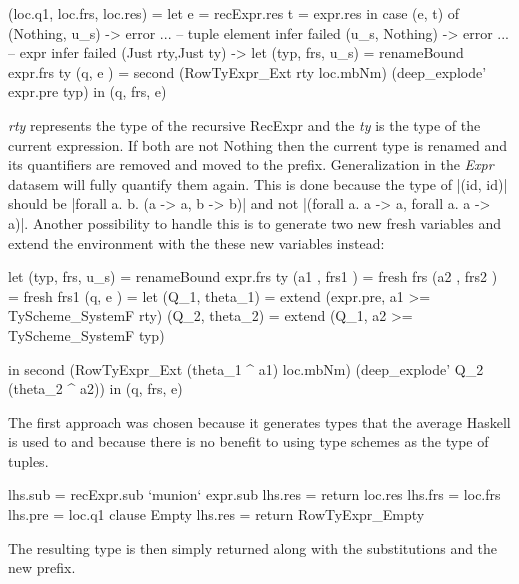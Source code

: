 \begin{code}    
   (loc.q1, loc.frs, loc.res)
     =  let  e  = recExpr.res
             t  = expr.res
        in case (e, t) of
             (Nothing, u_s) -> error ... -- tuple element infer failed
             (u_s, Nothing) -> error ... -- expr infer failed
             (Just rty,Just ty) -> 
                let  (typ, frs,  u_s)  = renameBound expr.frs ty 
                     (q,   e        )  = second  (RowTyExpr_Ext rty loc.mbNm) 
                                                 (deep_explode' expr.pre typ)
                in (q, frs, e)
\end{code}
\emph{rty} represents the type of the recursive RecExpr and the \emph{ty} is the type of the current expression. If both are not Nothing then the current type is renamed and its quantifiers are removed and moved to the prefix. Generalization in the \emph{Expr} datasem will fully quantify them again. This is done because the type of |(id, id)| should be |forall a. b. (a -> a, b -> b)| and not |(forall a. a -> a, forall a. a -> a)|. Another possibility to handle this is to generate two new fresh variables and extend the environment with the these new variables instead:

\begin{code}
                let  (typ, frs, u_s)  = renameBound expr.frs ty 
                     (a1 , frs1    )  = fresh frs
                     (a2 , frs2    )  = fresh frs1
                     (q,   e       )  = let (Q_1, theta_1) = extend (expr.pre, a1 >= TyScheme_SystemF rty)
                                           (Q_2, theta_2) = extend (Q_1, a2 >= TyScheme_SystemF typ)

                                       in second  (RowTyExpr_Ext (theta_1 ^ a1) loc.mbNm) 
                                                  (deep_explode' Q_2 (theta_2 ^ a2))
                in (q, frs, e)
\end{code}
The first approach was chosen because it generates types that the average Haskell is used to and because there is no benefit to using type schemes as the type of tuples.

\begin{code}                              
      lhs.sub  = recExpr.sub `munion` expr.sub
      lhs.res  = return loc.res
      lhs.frs  = loc.frs
      lhs.pre  = loc.q1
   clause Empty
      lhs.res  = return RowTyExpr_Empty
\end{code}
The resulting type is then simply returned along with the substitutions and the new prefix. 

